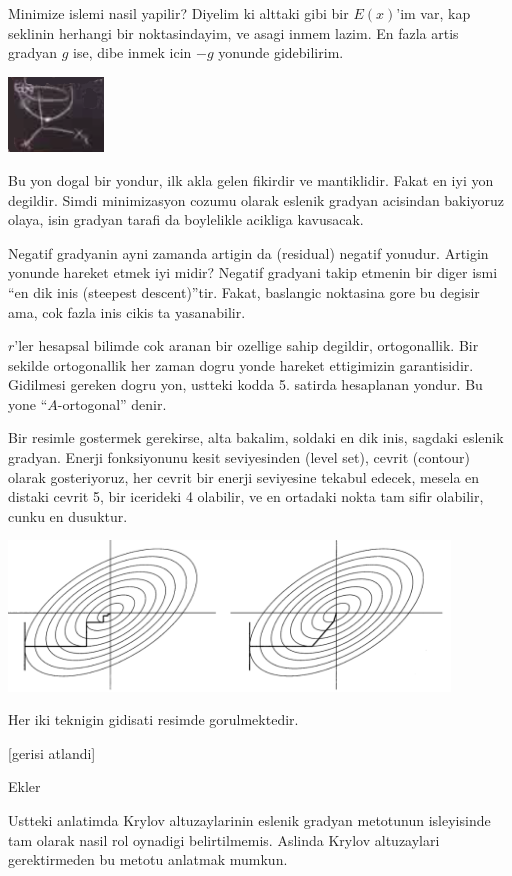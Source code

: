 \documentclass[12pt,fleqn]{article}\usepackage{../common}
\begin{document}
Minimize islemi nasil yapilir? Diyelim ki alttaki gibi bir $E(x)$'im var,
kap seklinin herhangi bir noktasindayim, ve asagi inmem lazim. En fazla
artis gradyan $g$ ise, dibe inmek icin $-g$ yonunde gidebilirim. 

\includegraphics[height=2cm]{19_1.png}

Bu yon dogal bir yondur, ilk akla gelen fikirdir ve mantiklidir. Fakat en
iyi yon degildir. Simdi minimizasyon cozumu olarak eslenik gradyan
acisindan bakiyoruz olaya, isin gradyan tarafi da boylelikle acikliga
kavusacak. 

Negatif gradyanin ayni zamanda artigin da (residual) negatif
yonudur. Artigin yonunde hareket etmek iyi midir? Negatif gradyani takip
etmenin bir diger ismi ``en dik inis (steepest descent)''tir. Fakat,
baslangic noktasina gore bu degisir ama, cok fazla inis cikis ta
yasanabilir.

$r$'ler hesapsal bilimde cok aranan bir ozellige sahip degildir,
ortogonallik. Bir sekilde ortogonallik her zaman dogru yonde hareket
ettigimizin garantisidir. Gidilmesi gereken dogru yon, ustteki kodda
5. satirda hesaplanan yondur. Bu yone ``$A$-ortogonal'' denir. 

Bir resimle gostermek gerekirse, alta bakalim, soldaki en dik inis, sagdaki
eslenik gradyan. Enerji fonksiyonunu kesit seviyesinden (level set), cevrit
(contour) olarak gosteriyoruz, her cevrit bir enerji seviyesine tekabul
edecek, mesela en distaki cevrit 5, bir icerideki 4 olabilir, ve en
ortadaki nokta tam sifir olabilir, cunku en dusuktur. 

\includegraphics[height=4cm]{19_2.png}

Her iki teknigin gidisati resimde gorulmektedir. 

[gerisi atlandi]

Ekler 

Ustteki anlatimda Krylov altuzaylarinin eslenik gradyan metotunun
isleyisinde tam olarak nasil rol oynadigi belirtilmemis. Aslinda Krylov
altuzaylari gerektirmeden bu metotu anlatmak mumkun. 
\end{document}

